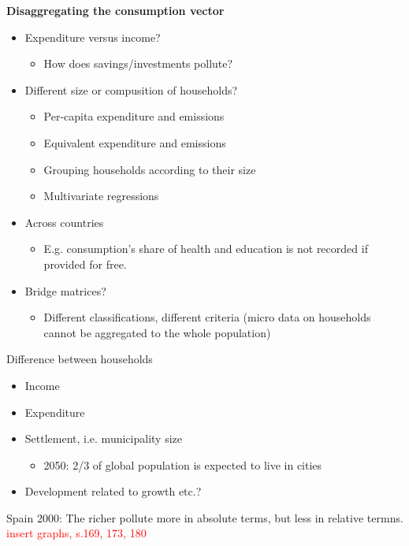 \begin{multicols}{2}
 \textbf{Disaggregating the consumption vector}\\
 \begin{itemize}
  \item Expenditure versus income?
        \begin{itemize}
         \item  How does savings/investments pollute?
        \end{itemize}
  \item Different size or compusition of households?
        \begin{itemize}
         \item Per-capita expenditure and emissions
         \item Equivalent expenditure and emissions
         \item Grouping households according to their size
         \item Multivariate regressions
        \end{itemize}
  \item Across countries
        \begin{itemize}
         \item E.g. consumption's share of health and education is not recorded if provided for free.
        \end{itemize}
  \item Bridge matrices?
        \begin{itemize}
         \item Different classifications, different criteria (micro data on households cannot be aggregated to the whole population)
        \end{itemize}
 \end{itemize}
 Difference between households
 \begin{itemize}
  \item Income
  \item Expenditure
  \item Settlement, i.e. municipality size
        \begin{itemize}
         \item 2050: 2/3 of global population is expected to live in cities
        \end{itemize}
  \item Development related to growth etc.?
 \end{itemize}
\end{multicols}\noindent
Spain 2000: The richer pollute more in absolute terms, but less in relative termns.
\textcolor{red}{insert graphs, s.169, 173, 180}
